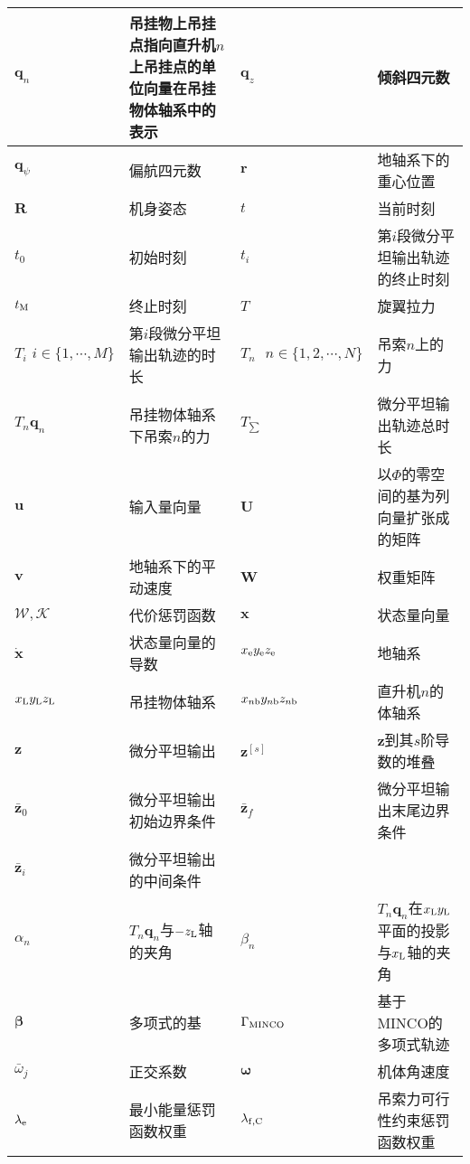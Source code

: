 \noindent\begin{tabu} to \hline
$\boldsymbol{q}_n$ & 吊挂物上吊挂点指向直升机$n$上吊挂点的单位向量在吊挂物体轴系中的表示 & $\boldsymbol{q}_z$ & 倾斜四元数 \\ \hline
$\boldsymbol{q}_{\psi}$ & 偏航四元数 & $\boldsymbol{r}$ & 地轴系下的重心位置 \\ \hline
$\boldsymbol{R}$ & 机身姿态 & $t$ & 当前时刻 \\ \hline
$t_0$ & 初始时刻 & $t_i$ & 第$i$段微分平坦输出轨迹的终止时刻 \\ \hline
$t_{\rm{M}}$ & 终止时刻 & $T$ & 旋翼拉力  \\ \hline
$T_i \,\, i \in \{1,\cdots,M\}$ & 第$i$段微分平坦输出轨迹的时长 & $T_n \,\,\,\, n\in\{1,2,\cdots,N\}$ & 吊索$n$上的力 \\ \hline
$T_n\boldsymbol{q}_n$& 吊挂物体轴系下吊索$n$的力 & $T_{\sum}$ & 微分平坦输出轨迹总时长 \\ \hline
$\boldsymbol{u}$ & 输入量向量 & $\boldsymbol{U}$ & 以$\Phi$的零空间的基为列向量扩张成的矩阵 \\ \hline
$\boldsymbol{v}$ & 地轴系下的平动速度 & $\boldsymbol{W}$ & 权重矩阵 \\ \hline
$\mathcal{W}, \mathcal{K}$ & 代价惩罚函数 & $\boldsymbol{x}$ & 状态量向量 \\ \hline
$\dot{\boldsymbol{x}}$ & 状态量向量的导数 & $x_{\rm{e}}y_{\rm{e}}z_{\rm{e}}$ & 地轴系 \\ \hline
$x_{\rm{L}}y_{\rm{L}}z_{\rm{L}}$ & 吊挂物体轴系 & $x_{n\rm{b}}y_{n\rm{b}}z_{n\rm{b}}$ & 直升机$n$的体轴系 \\ \hline
$\boldsymbol{z}$ & 微分平坦输出 & $\boldsymbol{z}^{[s]}$ & $\boldsymbol{z}$到其$s$阶导数的堆叠 \\ \hline
$\bar{\boldsymbol{z}}_0$ & 微分平坦输出初始边界条件 & $\bar{\boldsymbol{z}}_f$ &微分平坦输出末尾边界条件 \\ \hline
$\bar{\boldsymbol{z}}_i$ & 微分平坦输出的中间条件 & & \\ \hline
$\alpha_n$ & $T_n\boldsymbol{q}_n$与$-z_{\rm{L}}$轴的夹角 & $\beta_n$ & $T_n\boldsymbol{q}_n$在$x_{\rm{L}}y_{\rm{L}}$平面的投影与$x_{\rm{L}}$轴的夹角 \\ \hline
$\boldsymbol{\beta}$ & 多项式的基 & $\Gamma_{\rm{MINCO}}$ & 基于MINCO的多项式轨迹 \\ \hline
$\bar{\omega}_j$ & 正交系数 & $\boldsymbol{\omega}$ & 机体角速度  \\ \hline
$\lambda_{\rm{e}}$ & 最小能量惩罚函数权重 & $\lambda_{\rm{f,C}}$ & 吊索力可行性约束惩罚函数权重 \\ \hline 

\end{tabu}
